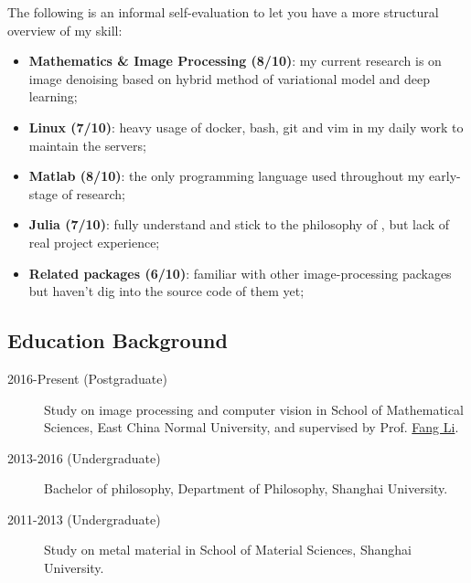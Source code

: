 The following is an informal self-evaluation to let you have a more structural overview of my skill:
\begin{itemize}
    \item \textbf{Mathematics \& Image Processing (8/10)}: my current research is on image denoising based on hybrid method of variational model and deep learning;
    \item \textbf{Linux (7/10)}: heavy usage of docker, bash, git and vim in my daily work to maintain the servers;
    \item \textbf{Matlab (8/10)}: the only programming language used throughout my early-stage of research;
    \item \textbf{Julia (7/10)}: fully understand and stick to the philosophy of \langjulia, but lack of real project experience;
    \item \textbf{Related packages (6/10)}: familiar with other image-processing packages but haven't dig into the source code of them yet;
\end{itemize}

\subsection*{Education Background}

\begin{description}
    \item[2016-Present (Postgraduate)]Study on image processing and computer vision in School of Mathematical Sciences, East China Normal University, and supervised by Prof. \href{http://math.ecnu.edu.cn/~fli/}{\textsf{Fang Li}}.
    \item[2013-2016 (Undergraduate)] Bachelor of philosophy, Department of Philosophy, Shanghai University.
    \item[2011-2013 (Undergraduate)] Study on metal material in School of Material Sciences, Shanghai University.
\end{description}
